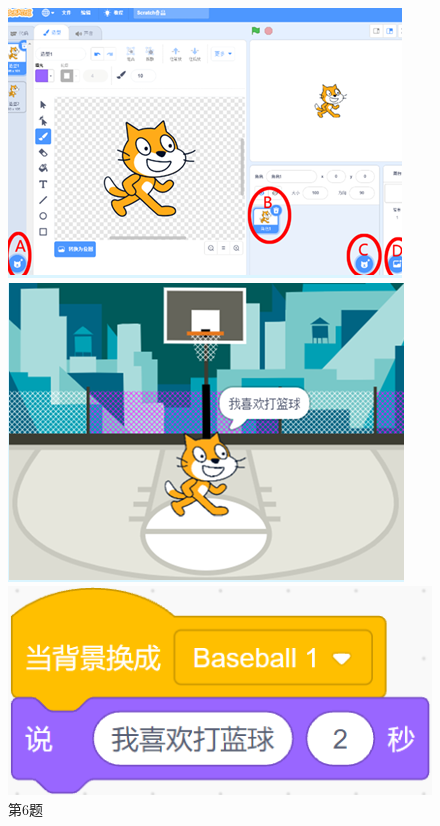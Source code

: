 \documentclass[10pt, a4paper]{article}
\begin{document}
\begin{enumerate}
\begin{figure}[htbp]
\begin{minipage}[t]{.2\textwidth}
                \includegraphics[width=\textwidth]{6.png}
                \caption*{第6题}
            \end{minipage}
            \begin{minipage}[t]{.38\textwidth}
                \centering
                \begin{minipage}[t]{.5\textwidth}
                    \centering
                    \includegraphics[width=\textwidth]{8-1.png}
                \end{minipage}
                \begin{minipage}[t]{.48\textwidth}
                    \centering
                    \includegraphics[width=\textwidth]{8-2.png}

\end{minipage}
\end{minipage}
\end{figure}
\end{enumerate}
\end{document}
